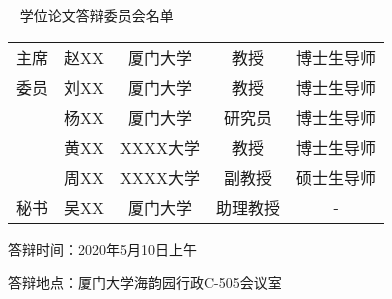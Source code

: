 

\begin{namelist}
\begin{center}
	~
	\vskip 0.1cm
	{\heiti {} 学位论文答辩委员会名单}
	\vskip 1cm
	\begin{tabularx}{\textwidth}{@{\extracolsep{\fill}}ccccc} 
		主席 & 赵XX & 厦门大学 & 教授 & 博士生导师\\ 
		委员 & 刘XX & 厦门大学 & 教授 & 博士生导师\\ 
			& 杨XX & 厦门大学 & 研究员 & 博士生导师\\ 
			& 黄XX & XXXX大学 & 教授 & 博士生导师\\ 
			& 周XX & XXXX大学 & 副教授 & 硕士生导师\\ 
		秘书 & 吴XX & 厦门大学 & 助理教授 & -\\ 
	\end{tabularx}
\end{center}
\vspace{1cm}

\noindent 答辩时间：2020年5月10日上午

\noindent 答辩地点：厦门大学海韵园行政C-505会议室


\end{namelist}
